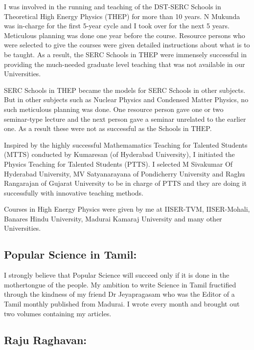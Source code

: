 I was involved in the running and teaching of the DST-SERC
Schools in Theoretical High Energy Physics (THEP) for more
than 10 years. N Mukunda was in-charge for the first 5-year
cycle and I took over for the next 5 years. Meticulous planning
was done one year before the course. Resource persons who were
selected to give the courses were given detailed instructions
about what is to be taught. As a result, the SERC Schools in
THEP were immensely successful in providing the much-needed
graduate level teaching that was not available in our Universities.


SERC Schools in THEP became the models for SERC Schools in other
subjects. But in other subjects such as Nuclear Physics and
Condensed Matter Physics, no such meticulous planning was do\-ne.
One resource person gave one or two seminar-type lecture and the
next person gave a seminar unrelated to the earlier one. As a result
these were not as successful as the Schools in THEP.


Inspired by the highly successful Mathemamatics Teaching for Talented 
Students (MTTS) conducted by Kumaresan (of Hyderabad University), I 
initiated the Physics Teaching for Talen\-ted Students (PTTS). I selected 
M Sivakumar Of Hyderabad University, MV Satyanarayana of Pondicherry 
University and Raghu Rangarajan of Gujarat University to be in charge 
of PTTS and they are doing it successfully with innovative teaching 
methods.


Courses in High Energy Physics were given by me at IISER-TVM, 
IISER-Mohali, Banares Hindu University, Madurai Kamaraj University and 
many other Universities.


\subsection*{Popular Science in Tamil:}

I strongly believe that Popular Science will succeed only if it is done 
in the mothertongue of the people. My ambition to write Science in Tamil 
fructified through the kindness of my friend Dr Jeyapragasam who was the 
Editor of a Tamil monthly published from Madurai. I wrote every month 
and brought out two volu\-mes containing my articles.

\vspace{-\topsep}
\subsection*{Raju Raghavan:}

